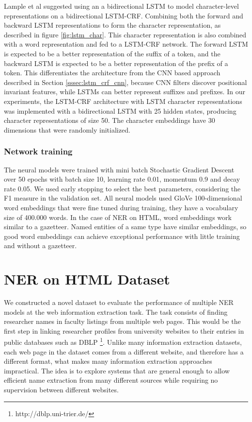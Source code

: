 \documentclass[sigconf]{acmart}
\begin{document}
Lample et al \cite{Lample2016} suggested using an a bidirectional LSTM to model character-level 
representations on a bidirectional LSTM-CRF. Combining both the forward and backward 
LSTM representations to form the character representation, as described in figure \ref{fig:lstm_char}. 
This character representation is also combined with a word representation and fed to a LSTM-CRF network. 
The forward LSTM is expected to be a better
representation of the suffix of a token, and the backward LSTM is expected to be a
better representation of the prefix of a token. This differentiates the architecture
from the CNN based approach described in Section \ref{sssec:lstm_crf_cnn}, because CNN filters 
discover positional invariant features, while LSTMs can better represent suffixes and prefixes. In our experiments, 
the LSTM-CRF architecture with LSTM character representations was implemented with a bidirectional LSTM
with 25 hidden states, producing character representations of size 50. The character embeddings
have 30 dimensions that were randomly initialized.

\subsubsection{Network training}

The neural models were trained with mini batch Stochastic Gradient Descent over 50 epochs with batch size 10,
learning rate 0.01, momentum 0.9 and decay rate 0.05. We used early stopping \cite{Caruana2000} to select the best 
parameters, considering the F1 measure in the validation set. All neural models used 
GloVe 100-dimensional word embeddings \cite{Pennington2014} that were fine tuned during training,
they have a vocabulary size of 400.000 words.
In the case of NER on HTML, word embeddings work similar to a gazetteer. Named entities 
of a same type have similar embeddings, so good word embeddings can achieve exceptional 
performance with little training and without a gazetteer. 

\section{NER on HTML Dataset}
\label{sec:ner_dataset}

We constructed a novel dataset to evaluate the performance of multiple NER models
at the web information extraction task. The task consists of finding researcher
names in faculty listings from multiple web pages. This would be the 
first step in linking researcher profiles from university websites to their entries
in public databases such as DBLP \footnote{http://dblp.uni-trier.de/}. Unlike many
information extraction datasets, each web page in the dataset comes from a different 
website, and therefore has a different format, what makes many information
extraction approaches impractical. The idea is to explore systems that are general 
enough to allow efficient name extraction from many different sources while requiring
no supervision between different websites. 
\end{document}
